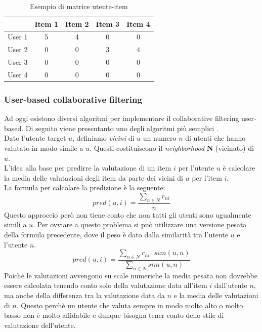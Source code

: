\begin{table}[H]
    \centering
    \begin{tabular}{|c|c|c|c|c|}
        \hline
        & Item 1 & Item 2 & Item 3 & Item 4 \\
        \hline
        User 1 & 5 & 4 & 0 & 0 \\ \hline
        User 2 & 0 & 0 & 3 & 4 \\ \hline
        User 3 & 0 & 0 & 0 & 0 \\ \hline
        User 4 & 0 & 0 & 0 & 0 \\
        \hline
    \end{tabular}
    \caption{Esempio di matrice utente-item}
\end{table}


\subsubsection{User-based collaborative filtering}
Ad oggi esistono diversi algoritmi per implementare il collaborative filtering user-based. Di seguito viene presentanto uno degli algoritmi più semplici \cite{CFRS}.\\
Dato l'utente target $u$, definiamo \textit{vicini} di $u$ un numero $n$ di utenti che hanno valutato in modo simile a $u$. Questi costituiscono il \textit{neighborhood} \textbf{N} (vicinato) di $u$.\\
L'idea alla base per predirre la valutazione di un item $i$ per l'utente $u$ è calcolare la media delle valutazioni degli item da parte dei vicini di $u$ per l'item $i$.\\
La formula per calcolare la predizione è la seguente:
\begin{equation}
    pred(u,i) = \frac{\sum_{n \in N} r_{ni}}{n}
\end{equation}
Questo approccio però non tiene conto che non tutti gli utenti sono ugualmente simili a $u$. Per ovviare a questo problema si può utilizzare una versione pesata della formula precedente, dove il peso è dato dalla similarità tra l'utente $u$ e l'utente $n$.
\begin{equation}
    pred(u,i) = \frac{\sum_{n \in N} r_{ni} \cdot sim(u,n)}{\sum_{n \in N} sim(u,n)}
\end{equation}
Poichè le valutazioni avvengono su scale numeriche la media pesata non dovrebbe essere calcolata tenendo conto solo della valutazione data all'item $i$ dall'utente $n$, ma anche della differenza tra la valutazione data da $n$ e la media delle valutazioni di $n$. Questo perchè un utente che valuta sempre in modo molto alto o molto basso non è molto affidabile e dunque bisogna tener conto dello stile di valutazione dell'utente.
